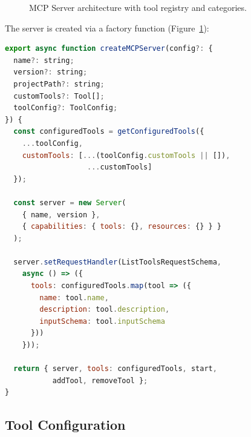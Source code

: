 \documentclass[11pt,twocolumn]{article}
\begin{document}
\begin{figure}[t]
\centering
{}
\caption{MCP Server architecture with tool registry and categories.}
\label{fig:arch}
\end{figure}

The server is created via a factory function (Figure~\ref{fig:arch}):

\begin{lstlisting}[language=JavaScript]
export async function createMCPServer(config?: {
  name?: string;
  version?: string;
  projectPath?: string;
  customTools?: Tool[];
  toolConfig?: ToolConfig;
}) {
  const configuredTools = getConfiguredTools({
    ...toolConfig,
    customTools: [...(toolConfig.customTools || []),
                   ...customTools]
  });

  const server = new Server(
    { name, version },
    { capabilities: { tools: {}, resources: {} } }
  );

  server.setRequestHandler(ListToolsRequestSchema,
    async () => ({
      tools: configuredTools.map(tool => ({
        name: tool.name,
        description: tool.description,
        inputSchema: tool.inputSchema
      }))
    }));

  return { server, tools: configuredTools, start,
           addTool, removeTool };
}
\end{lstlisting}

\subsection{Tool Configuration}
\end{document}
